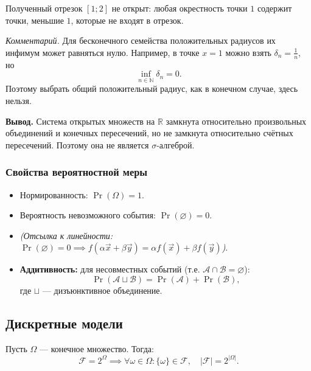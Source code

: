 \begin{example}
    Полученный отрезок $[1;2]$ не открыт:
    любая окрестность точки $1$ содержит точки,
    меньшие $1$, которые не входят в отрезок.

    \textit{Комментарий.}
    Для бесконечного семейства положительных радиусов
    их инфимум может равняться нулю.
    Например, в точке $x=1$ можно взять
    $\delta_n = \frac{1}{n}$, но
    \[
        \inf_{n \in \mathbb{N}} \delta_n = 0.
    \]
    Поэтому выбрать общий положительный радиус,
    как в конечном случае, здесь нельзя.

    \medskip
    \textbf{Вывод.}
    Система открытых множеств на $\mathbb{R}$ замкнута
    относительно произвольных объединений и конечных пересечений,
    но не замкнута относительно счётных пересечений.
    Поэтому она не является $\sigma$-алгеброй.
\end{example}

\subsubsection{Свойства вероятностной меры}

\begin{exercise}
    \begin{itemize}
        \item Нормированность: $\Pr(\Omega) = 1$.
        \item Вероятность невозможного события:
        $\Pr(\varnothing) = 0$.
        \item \textit{(Отсылка к линейности:
        $\Pr(\varnothing) = 0 \implies
        f(\alpha \vec{x} + \beta \vec{y})
        = \alpha f(\vec{x}) + \beta f(\vec{y})$)}.
        \item \textbf{Аддитивность:} для несовместных событий
        (т.е. $\mathcal{A} \cap \mathcal{B} = \varnothing$):
        \[
            \Pr(\mathcal{A} \sqcup \mathcal{B})
            =
            \Pr(\mathcal{A}) + \Pr(\mathcal{B}),
        \]
        где $\sqcup$ --- дизъюнктивное объединение.
    \end{itemize}
\end{exercise}

\subsection{Дискретные модели}

\begin{definition}
    Пусть $\Omega$ --- конечное множество. Тогда:
    \[
        \mathcal{F} = 2^{\Omega}
        \implies
        \forall \omega \in \Omega \colon
        \{\omega\} \in \mathcal{F},
        \quad
        |\mathcal{F}| = 2^{|\Omega|}.
    \]
\end{definition}

